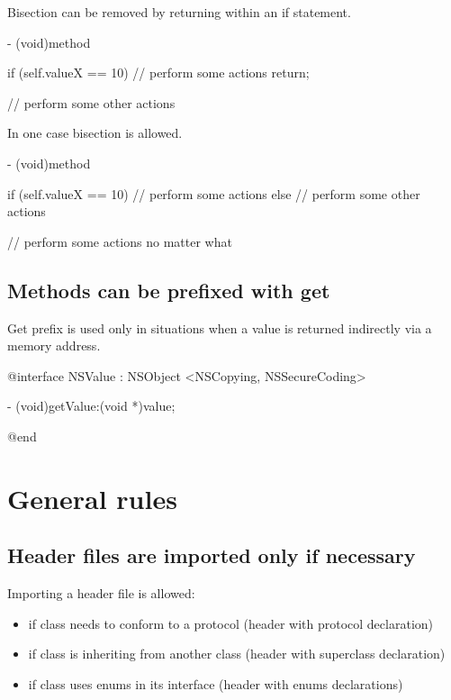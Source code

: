 \documentclass[10pt]{extarticle}
\begin{document}
Bisection can be removed by returning within an if statement.

\begin{codelisting}
- (void)method
{
    if (self.valueX == 10) {
        // perform some actions
        return;
    }
    
    // perform some other actions
}
\end{codelisting}

In one case bisection is allowed.

\begin{codelisting}
- (void)method
{
    if (self.valueX == 10) {
        // perform some actions
    }
    else {
        // perform some other actions
    }
    
    // perform some actions no matter what
}
\end{codelisting}


\subsection{Methods can be prefixed with get}

Get prefix is used only in situations when a value is returned indirectly via a memory address.

\begin{codelisting}
@interface NSValue : NSObject <NSCopying, NSSecureCoding>

- (void)getValue:(void *)value;

@end
\end{codelisting}


\section{General rules}

\subsection{Header files are imported only if necessary}

Importing a header file is allowed:

\begin{itemize}
\item if class needs to conform to a protocol (header with protocol declaration)
\item if class is inheriting from another class (header with superclass declaration)
\item if class uses enums in its interface (header with enums declarations)
\end{itemize}
\end{document}
